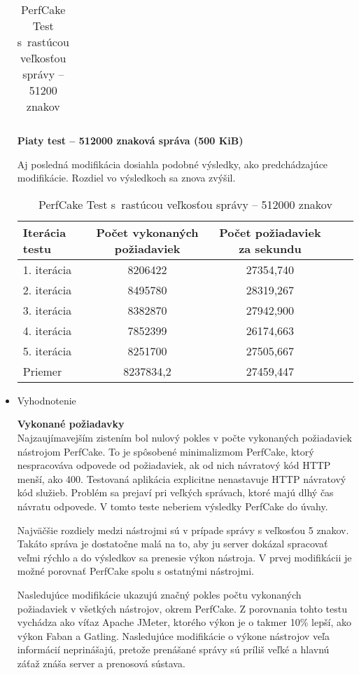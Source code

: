 \documentclass[12pt,oneside,final]{fithesis-utf8}
\begin{document}
\begin{itemize}
\begin{table}[H]
\begin{center}
\begin{tabular}{ | l | c | c | c | c |}
\end{tabular}
\end{center}
\caption{PerfCake Test s~rastúcou veľkosťou správy -- 51200 znakov}
\end{table}


\textbf{Piaty test -- 512000 znaková správa (500 KiB)}

Aj posledná modifikácia dosiahla podobné výsledky, ako predchádzajúce modifikácie. Rozdiel vo výsledkoch sa znova zvýšil.

\begin{table}[H]
\begin{center}
\begin{tabular}{ | l | c | c | c | c |}
		\hline
		 \textbf{Iterácia testu} & \textbf{Počet vykonaných požiadaviek} & \textbf{Počet požiadaviek za sekundu} \\ \hline
		 1. iterácia & 8206422 & 27354,740 \\ \hline
		 2. iterácia & 8495780 & 28319,267 \\ \hline
		 3. iterácia & 8382870 & 27942,900 \\ \hline
		 4. iterácia & 7852399 & 26174,663 \\ \hline
		 5. iterácia & 8251700 & 27505,667 \\ \hline
		 Priemer & 8237834,2 & 27459,447 \\ \hline
		 
\end{tabular}
\end{center}
\caption{PerfCake Test s~rastúcou veľkosťou správy -- 512000 znakov}
\end{table}


\item Vyhodnotenie

\textbf{Vykonané požiadavky}\\
Najzaujímavejším zistením bol nulový pokles v počte vykonaných požiadaviek nástrojom PerfCake. To je spôsobené minimalizmom PerfCake, ktorý nespracováva odpovede od požiadaviek, ak od nich návratový kód HTTP menší, ako 400. Testovaná aplikácia explicitne nenastavuje HTTP návratový kód služieb. Problém sa prejaví pri veľkých správach, ktoré majú dlhý čas návratu odpovede. V tomto teste neberiem výsledky PerfCake do úvahy.
\par Najväčšie rozdiely medzi nástrojmi sú v prípade správy s veľkosťou 5 znakov. Takáto správa je dostatočne malá na to, aby ju server dokázal spracovať veľmi rýchlo a do výsledkov sa prenesie výkon nástroja. V prvej modifikácii je možné porovnať PerfCake spolu s ostatnými nástrojmi.
\par Nasledujúce modifikácie ukazujú značný pokles počtu vykonaných požiadaviek v všetkých nástrojov, okrem PerfCake. Z porovnania tohto testu vychádza ako víťaz Apache JMeter, ktorého výkon je o takmer 10\% lepší, ako výkon Faban a Gatling. Nasledujúce modifikácie o výkone nástrojov veľa informácií neprinášajú, pretože prenášané správy sú príliš veľké a hlavnú záťaž znáša server a prenosová sústava.


\end{itemize}
\end{document}
